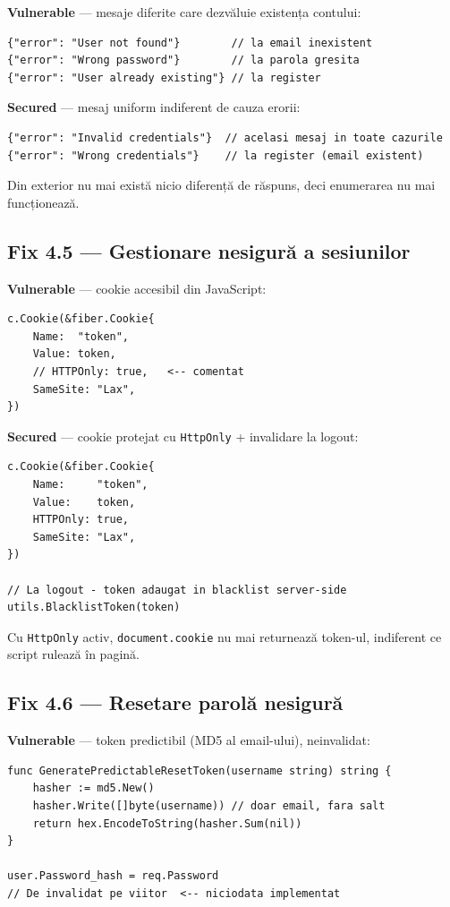\documentclass[12pt]{article}
\begin{document}
\textbf{Vulnerable} --- mesaje diferite care dezvăluie existența contului:
\begin{lstlisting}[language={}]
{"error": "User not found"}        // la email inexistent
{"error": "Wrong password"}        // la parola gresita
{"error": "User already existing"} // la register
\end{lstlisting}

\textbf{Secured} --- mesaj uniform indiferent de cauza erorii:
\begin{lstlisting}[language={}]
{"error": "Invalid credentials"}  // acelasi mesaj in toate cazurile
{"error": "Wrong credentials"}    // la register (email existent)
\end{lstlisting}

Din exterior nu mai există nicio diferență de răspuns, deci enumerarea nu mai funcționează.

\subsection{Fix 4.5 --- Gestionare nesigură a sesiunilor}

\textbf{Vulnerable} --- cookie accesibil din JavaScript:
\begin{lstlisting}[language={}]
c.Cookie(&fiber.Cookie{
    Name:  "token",
    Value: token,
    // HTTPOnly: true,   <-- comentat
    SameSite: "Lax",
})
\end{lstlisting}

\textbf{Secured} --- cookie protejat cu \texttt{HttpOnly} + invalidare la logout:
\begin{lstlisting}[language={}]
c.Cookie(&fiber.Cookie{
    Name:     "token",
    Value:    token,
    HTTPOnly: true,
    SameSite: "Lax",
})

// La logout - token adaugat in blacklist server-side
utils.BlacklistToken(token)
\end{lstlisting}

Cu \texttt{HttpOnly} activ, \texttt{document.cookie} nu mai returnează token-ul, indiferent ce script rulează în pagină.

\subsection{Fix 4.6 --- Resetare parolă nesigură}

\textbf{Vulnerable} --- token predictibil (MD5 al email-ului), neinvalidat:
\begin{lstlisting}[language={}]
func GeneratePredictableResetToken(username string) string {
    hasher := md5.New()
    hasher.Write([]byte(username)) // doar email, fara salt
    return hex.EncodeToString(hasher.Sum(nil))
}

user.Password_hash = req.Password
// De invalidat pe viitor  <-- niciodata implementat
\end{lstlisting}
\end{document}

